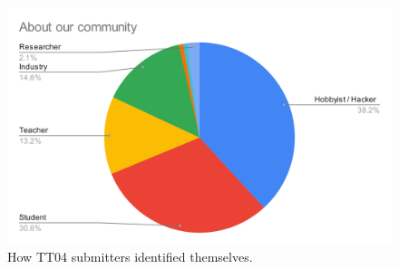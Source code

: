 \begin{figure}[!t]
\centering
\includegraphics[width=\columnwidth]{./Figs/about our community pie chart.png}
\caption{How TT04 submitters identified themselves.}
\label{fig:TT04_submitters}
\end{figure}
